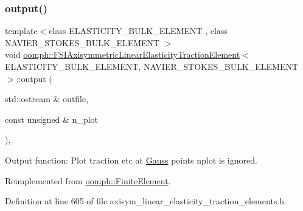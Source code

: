 \subsubsection{\texorpdfstring{output()}{output()}\hspace{0.1cm}{\footnotesize\ttfamily [2/4]}}
{\footnotesize\ttfamily template$<$class E\+L\+A\+S\+T\+I\+C\+I\+T\+Y\+\_\+\+B\+U\+L\+K\+\_\+\+E\+L\+E\+M\+E\+NT , class N\+A\+V\+I\+E\+R\+\_\+\+S\+T\+O\+K\+E\+S\+\_\+\+B\+U\+L\+K\+\_\+\+E\+L\+E\+M\+E\+NT $>$ \\
void \hyperlink{classoomph_1_1FSIAxisymmetricLinearElasticityTractionElement}{oomph\+::\+F\+S\+I\+Axisymmetric\+Linear\+Elasticity\+Traction\+Element}$<$ E\+L\+A\+S\+T\+I\+C\+I\+T\+Y\+\_\+\+B\+U\+L\+K\+\_\+\+E\+L\+E\+M\+E\+NT, N\+A\+V\+I\+E\+R\+\_\+\+S\+T\+O\+K\+E\+S\+\_\+\+B\+U\+L\+K\+\_\+\+E\+L\+E\+M\+E\+NT $>$\+::output (\begin{DoxyParamCaption}\item[{std\+::ostream \&}]{outfile,  }\item[{const unsigned \&}]{n\+\_\+plot }\end{DoxyParamCaption})\hspace{0.3cm}{\ttfamily [inline]}, {\ttfamily [virtual]}}



Output function\+: Plot traction etc at \hyperlink{classoomph_1_1Gauss}{Gauss} points nplot is ignored. 



Reimplemented from \hyperlink{classoomph_1_1FiniteElement_afa9d9b2670f999b43e6679c9dd28c457}{oomph\+::\+Finite\+Element}.



Definition at line 605 of file axisym\+\_\+linear\+\_\+elasticity\+\_\+traction\+\_\+elements.\+h.

\mbox{\label{classoomph_1_1FSIAxisymmetricLinearElasticityTractionElement_abe362d8d30993c78c59c8ed199b40659}} 
